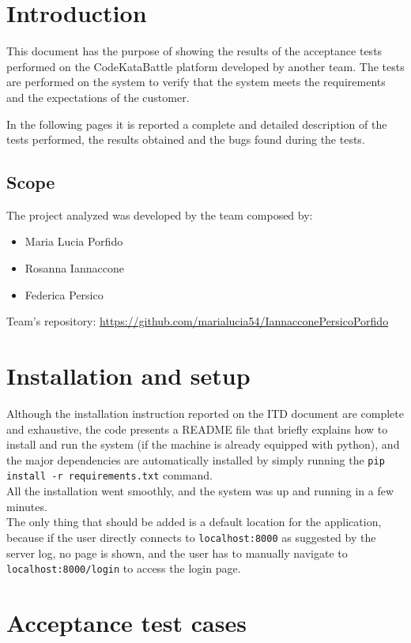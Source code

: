 \chapter{Introduction}

This document has the purpose of showing the results of the acceptance tests performed on the CodeKataBattle platform developed by another team. The tests are performed on the system to verify that the system meets the requirements and the expectations of the customer.

In the following pages it is reported a complete and detailed description of the tests performed, the results obtained and the bugs found during the tests.

\section{Scope}

The project analyzed was developed by the team composed by:
\begin{itemize}
    \item Maria Lucia Porfido
    \item Rosanna Iannaccone
    \item Federica Persico
\end{itemize}
Team's repository: \url{https://github.com/marialucia54/IannacconePersicoPorfido}

\chapter{Installation and setup}

Although the installation instruction reported on the ITD document are complete and exhaustive, the code presents a README file that briefly explains how to install and run the system (if the machine is already equipped with python), and the major dependencies are automatically installed by simply running the \texttt{pip install -r requirements.txt} command.\\

All the installation went smoothly, and the system was up and running in a few minutes.\\The only thing that should be added is a default location for the application, because if the user directly connects to \texttt{localhost:8000} as suggested by the server log, no page is shown, and the user has to manually navigate to \texttt{localhost:8000/login} to access the login page.


\chapter{Acceptance test cases}


